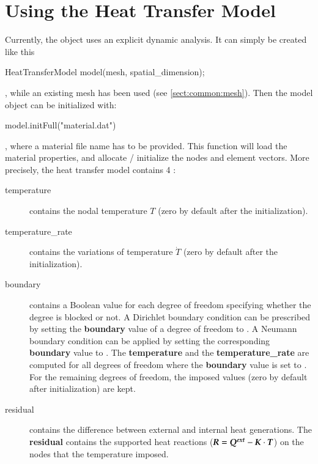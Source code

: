 \section{Using the Heat Transfer Model}
Currently, the  object uses an explicit dynamic analysis.
It can simply be created like this
\begin{cpp}
  HeatTransferModel model(mesh, spatial_dimension);
\end{cpp}
, while an existing mesh has been used (see \ref{sect:common:mesh}).
Then the model object can be initialized with:
\begin{cpp}
  model.initFull("material.dat")
\end{cpp}
, where a material file name has to be provided. This function will load the material 
properties, and allocate / initialize the nodes and element vectors.
More precisely, the heat transfer model contains 4 :
\begin{description}
\item[temperature] contains the nodal temperature $T$ (zero  by   default  after  the
  initialization). 
\item[temperature\_rate] contains the variations of temperature $\dot{T}$ 
  (zero  by   default  after  the
  initialization). 

\item[boundary] contains a  Boolean value for each degree  of freedom specifying
  whether the degree  is blocked or not. A Dirichlet  boundary condition can be
  prescribed by  setting the \textbf{boundary} value  of a degree  of freedom to
  .   A Neumann  boundary condition  can  be applied  by setting  the
  corresponding     \textbf{boundary}     value     to    .      The
  \textbf{temperature} and  the \textbf{temperature\_rate} are  computed for all
  degrees  of  freedom  where  the  \textbf{boundary}  value   is  set  to
  .  For the remaining degrees  of freedom, the imposed values (zero
  by default after  initialization) are kept.

\item[residual] contains the difference between external and internal heat generations. 
The \textbf{residual} contains the supported heat reactions ($\boldsymbol{R} = \boldsymbol{Q^{ext}} -\boldsymbol{K} \cdot \boldsymbol{T}$) on
  the nodes that the temperature imposed.
\end{description}

